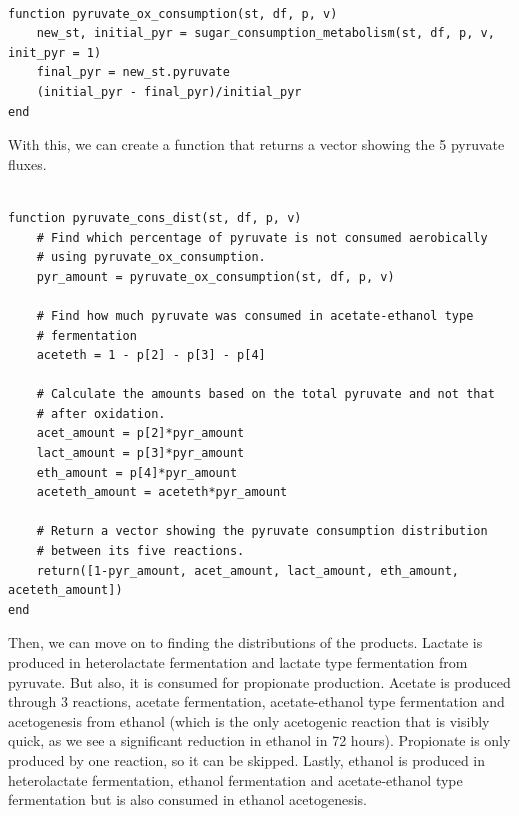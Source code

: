 \documentclass[11pt]{article}
\begin{document}
\begin{verbatim}

function pyruvate_ox_consumption(st, df, p, v)
    new_st, initial_pyr = sugar_consumption_metabolism(st, df, p, v, init_pyr = 1)
    final_pyr = new_st.pyruvate
    (initial_pyr - final_pyr)/initial_pyr
end

\end{verbatim}

With this, we can create a function that returns a vector showing the 5 pyruvate fluxes.

\begin{verbatim}

function pyruvate_cons_dist(st, df, p, v)
    # Find which percentage of pyruvate is not consumed aerobically
    # using pyruvate_ox_consumption.
    pyr_amount = pyruvate_ox_consumption(st, df, p, v)

    # Find how much pyruvate was consumed in acetate-ethanol type
    # fermentation
    aceteth = 1 - p[2] - p[3] - p[4]

    # Calculate the amounts based on the total pyruvate and not that
    # after oxidation.
    acet_amount = p[2]*pyr_amount
    lact_amount = p[3]*pyr_amount
    eth_amount = p[4]*pyr_amount
    aceteth_amount = aceteth*pyr_amount

    # Return a vector showing the pyruvate consumption distribution
    # between its five reactions.
    return([1-pyr_amount, acet_amount, lact_amount, eth_amount, aceteth_amount])
end

\end{verbatim}

Then, we can move on to finding the distributions of the products. Lactate is produced in heterolactate fermentation and lactate type fermentation from pyruvate. But also, it is consumed for propionate production. Acetate is produced through 3 reactions, acetate fermentation, acetate-ethanol type fermentation and acetogenesis from ethanol (which is the only acetogenic reaction that is visibly quick, as we see a significant reduction in ethanol in 72 hours). Propionate is only produced by one reaction, so it can be skipped. Lastly, ethanol is produced in heterolactate fermentation, ethanol fermentation and acetate-ethanol type fermentation but is also consumed in ethanol acetogenesis.
\end{document}
